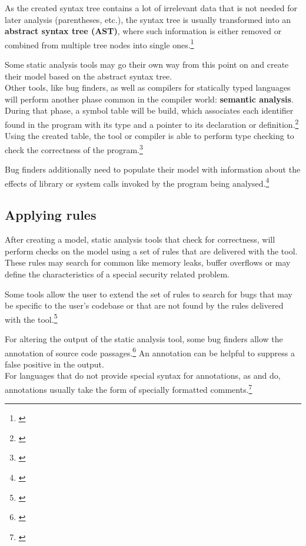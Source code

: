 As the created syntax tree contains a lot of irrelevant data that is not needed for later analysis (parentheses, etc.), the syntax tree is usually transformed into an \textbf{abstract syntax tree (AST)}, where such information is either removed or combined from multiple tree nodes into single ones.\footnote{\citep[99]{CompilerBasics}}

Some static analysis tools may go their own way from this point on and create their model based on the abstract syntax tree.\\Other tools, like bug finders, as well as compilers for statically typed languages will perform another phase common in the compiler world: \textbf{semantic analysis}. During that phase, a symbol table will be build, which associates each identifier found in the program with its type and a pointer to its declaration or definition.\footnote{\citep[76]{SecureProgramming}} Using the created table, the tool or compiler is able to perform type checking to check the correctness of the program.\footnote{\citep[76]{SecureProgramming}}

Bug finders additionally need to populate their model with information about the effects of library or system calls invoked by the program being analysed.\footnote{\citep[37]{SecureProgramming}}

\subsection{Applying rules}

After creating a model, static analysis tools that check for correctness, will perform checks on the model using a set of rules that are delivered with the tool. These rules may search for common  like memory leaks, buffer overflows or may define the characteristics of a special security related problem.

Some tools allow the user to extend the set of rules to search for bugs that may be specific to the user's codebase or that are not found by the rules delivered with the tool.\footnote{\citep[97]{SecureProgramming}}

For altering the output of the static analysis tool, some bug finders allow the annotation of source code passages.\footnote{\citep[99]{SecureProgramming}} An annotation can be helpful to suppress a false positive in the output.
\\For languages that do not provide special syntax for annotations, as  and  do, annotations usually
take the form of specially formatted comments.\footnote{\citep[99]{SecureProgramming}}

